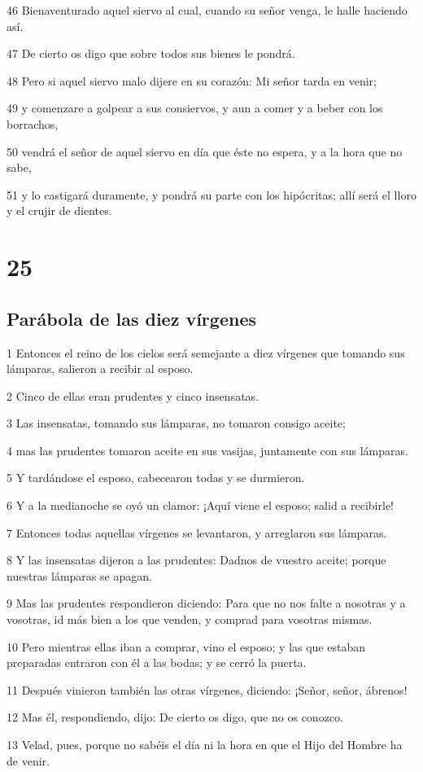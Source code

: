 \par 46 Bienaventurado aquel siervo al cual, cuando su señor venga, le halle haciendo así.
\par 47 De cierto os digo que sobre todos sus bienes le pondrá.
\par 48 Pero si aquel siervo malo dijere en su corazón: Mi señor tarda en venir;
\par 49 y comenzare a golpear a sus consiervos, y aun a comer y a beber con los borrachos,
\par 50 vendrá el señor de aquel siervo en día que éste no espera, y a la hora que no sabe,
\par 51 y lo castigará duramente, y pondrá su parte con los hipócritas; allí será el lloro y el crujir de dientes.

\chapter{25}

\section*{Parábola de las diez vírgenes}

\par 1 Entonces el reino de los cielos será semejante a diez vírgenes que tomando sus lámparas, salieron a recibir al esposo.
\par 2 Cinco de ellas eran prudentes y cinco insensatas.
\par 3 Las insensatas, tomando sus lámparas, no tomaron consigo aceite;
\par 4 mas las prudentes tomaron aceite en sus vasijas, juntamente con sus lámparas.
\par 5 Y tardándose el esposo, cabecearon todas y se durmieron.
\par 6 Y a la medianoche se oyó un clamor: ¡Aquí viene el esposo; salid a recibirle!
\par 7 Entonces todas aquellas vírgenes se levantaron, y arreglaron sus lámparas.
\par 8 Y las insensatas dijeron a las prudentes: Dadnos de vuestro aceite; porque nuestras lámparas se apagan.
\par 9 Mas las prudentes respondieron diciendo: Para que no nos falte a nosotras y a vosotras, id más bien a los que venden, y comprad para vosotras mismas.
\par 10 Pero mientras ellas iban a comprar, vino el esposo; y las que estaban preparadas entraron con él a las bodas; y se cerró la puerta.
\par 11 Después vinieron también las otras vírgenes, diciendo: ¡Señor, señor, ábrenos!
\par 12 Mas él, respondiendo, dijo: De cierto os digo, que no os conozco.
\par 13 Velad, pues, porque no sabéis el día ni la hora en que el Hijo del Hombre ha de venir.

